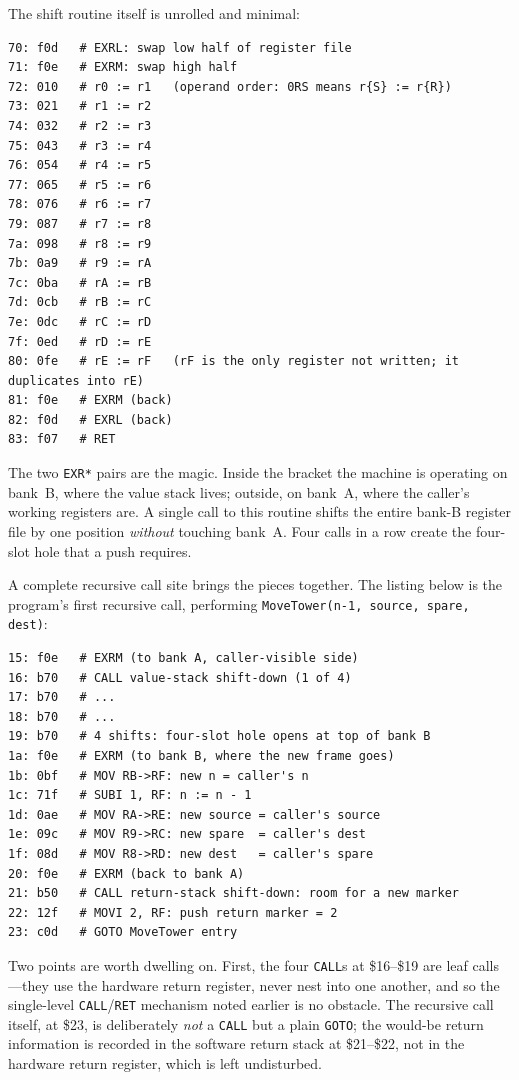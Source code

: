 \documentclass[11pt,a4paper]{article}
\begin{document}
\noindent
The shift routine itself is unrolled and minimal:

\begin{lstlisting}
70: f0d   # EXRL: swap low half of register file
71: f0e   # EXRM: swap high half
72: 010   # r0 := r1   (operand order: 0RS means r{S} := r{R})
73: 021   # r1 := r2
74: 032   # r2 := r3
75: 043   # r3 := r4
76: 054   # r4 := r5
77: 065   # r5 := r6
78: 076   # r6 := r7
79: 087   # r7 := r8
7a: 098   # r8 := r9
7b: 0a9   # r9 := rA
7c: 0ba   # rA := rB
7d: 0cb   # rB := rC
7e: 0dc   # rC := rD
7f: 0ed   # rD := rE
80: 0fe   # rE := rF   (rF is the only register not written; it duplicates into rE)
81: f0e   # EXRM (back)
82: f0d   # EXRL (back)
83: f07   # RET
\end{lstlisting}

\noindent
The two \texttt{EXR*} pairs are the magic. Inside the bracket the
machine is operating on bank~B, where the value stack lives; outside,
on bank~A, where the caller's working registers are. A single call to
this routine shifts the entire bank-B register file by one position
\emph{without} touching bank~A. Four calls in a row create the
four-slot hole that a push requires.

A complete recursive call site brings the pieces together. The
listing below is the program's first recursive call, performing
\texttt{MoveTower(n-1, source, spare, dest)}:

\begin{lstlisting}
15: f0e   # EXRM (to bank A, caller-visible side)
16: b70   # CALL value-stack shift-down (1 of 4)
17: b70   # ...
18: b70   # ...
19: b70   # 4 shifts: four-slot hole opens at top of bank B
1a: f0e   # EXRM (to bank B, where the new frame goes)
1b: 0bf   # MOV RB->RF: new n = caller's n
1c: 71f   # SUBI 1, RF: n := n - 1
1d: 0ae   # MOV RA->RE: new source = caller's source
1e: 09c   # MOV R9->RC: new spare  = caller's dest
1f: 08d   # MOV R8->RD: new dest   = caller's spare
20: f0e   # EXRM (back to bank A)
21: b50   # CALL return-stack shift-down: room for a new marker
22: 12f   # MOVI 2, RF: push return marker = 2
23: c0d   # GOTO MoveTower entry
\end{lstlisting}

\noindent
Two points are worth dwelling on. First, the four \texttt{CALL}s at
\$16--\$19 are leaf calls---they use the hardware return register,
never nest into one another, and so the single-level
\texttt{CALL}/\texttt{RET} mechanism noted earlier is no obstacle.
The recursive call itself, at \$23, is deliberately \emph{not} a
\texttt{CALL} but a plain \texttt{GOTO}; the would-be return
information is recorded in the software return stack at \$21--\$22,
not in the hardware return register, which is left undisturbed.
\end{document}
